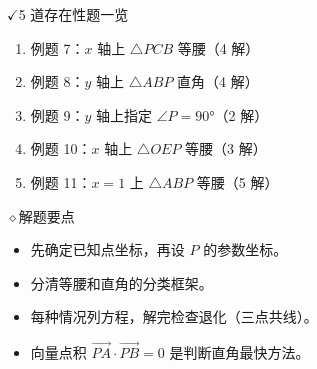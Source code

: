 \documentclass{exam-zh}
\newcommand{\eduIconCheck}{\(\checkmark\)}
\newcommand{\eduIconPin}{\(\diamond\)}
\newenvironment{eduBulletList}{%
  \begin{itemize}[
    label=\textbullet,
    leftmargin=5mm,
    itemsep=1.2mm,
    topsep=0pt,
    parsep=0pt
  ]
}{%
  \end{itemize}
}
\newenvironment{eduBottomGrid}{%
  \vspace{1mm}
  \par\noindent
}{%
  \par\vspace{1mm}
}
\newenvironment{eduSummaryLeft}{%
  \begin{minipage}[t]{0.30\linewidth}
}{%
  \end{minipage}
}
\newcommand{\eduSummaryDivider}{%
  \hspace{4mm}{\color{edu-line}\vrule width 0.35pt}\hspace{7mm}%
}
\newenvironment{eduSummaryRight}{%
  \begin{minipage}[t]{0.58\linewidth}
}{%
  \end{minipage}
}
\newenvironment{eduPlainList}{%
  \begin{enumerate}[
    label=(\arabic*),
    leftmargin=7mm,
    itemsep=1.2mm,
    topsep=0pt,
    parsep=0pt
  ]
}{%
  \end{enumerate}
}
\begin{document}
\begin{eduBottomGrid}
  \begin{eduSummaryLeft}
    \begin{eduSummaryBlock}{\eduIconCheck}{5 道存在性题一览}
    \begin{eduPlainList}
      \item 例题 7：$x$ 轴上 $\triangle PCB$ 等腰（4 解）      \item 例题 8：$y$ 轴上 $\triangle ABP$ 直角（4 解）      \item 例题 9：$y$ 轴上指定 $\angle P = 90°$（2 解）      \item 例题 10：$x$ 轴上 $\triangle OEP$ 等腰（3 解）      \item 例题 11：$x = 1$ 上 $\triangle ABP$ 等腰（5 解）    \end{eduPlainList}
    \end{eduSummaryBlock}
  \end{eduSummaryLeft}
  \eduSummaryDivider
  \begin{eduSummaryRight}
    \begin{eduSummaryBlock}{\eduIconPin}{解题要点}
    \begin{eduBulletList}
      \item 先确定已知点坐标，再设 $P$ 的参数坐标。      \item 分清等腰和直角的分类框架。      \item 每种情况列方程，解完检查退化（三点共线）。      \item 向量点积 $\overrightarrow{PA} \cdot \overrightarrow{PB} = 0$ 是判断直角最快方法。    \end{eduBulletList}
    \end{eduSummaryBlock}
  \end{eduSummaryRight}
\end{eduBottomGrid}
\end{document}
